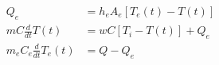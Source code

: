 \begin{equation}
  \begin{aligned}
    Q_e                        & = h_e A_e [T_e(t) - T(t)]
    \\
    m C \frac{d}{dt}T(t)       & = w C [T_i - T(t)] + Q_e
    \\
    m_e C_e \frac{d}{dt}T_e(t) & = Q - Q_e
  \end{aligned}
  \label{eq:elec_heat_tank01_2}
\end{equation}